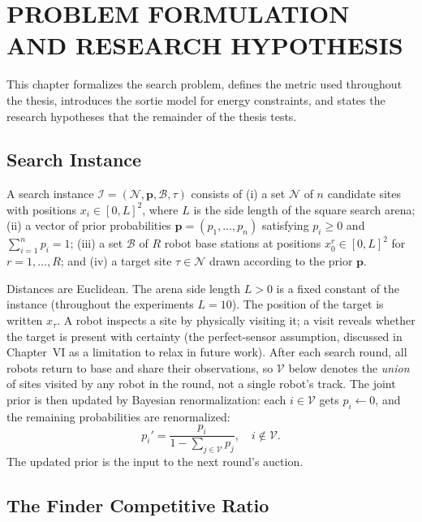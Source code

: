 \chapter{PROBLEM FORMULATION AND RESEARCH HYPOTHESIS}\label{ch:problem}

\begin{doublespacing}

This chapter formalizes the search problem, defines the metric used
throughout the thesis, introduces the sortie model for energy
constraints, and states the research hypotheses that the remainder of
the thesis tests.

\section{Search Instance}

\begin{definition}
A search instance $\mathcal{I} = (\mathcal{N}, \mathbf{p}, \mathcal{B}, \tau)$
consists of (i) a set $\mathcal{N}$ of $n$ candidate sites with positions
$x_i \in [0, L]^2$, where $L$ is the side length of the square search
arena; (ii) a vector of prior probabilities
$\mathbf{p} = (p_1, \ldots, p_n)$ satisfying $p_i \geq 0$ and
$\sum_{i=1}^n p_i = 1$; (iii) a set $\mathcal{B}$ of $R$ robot base
stations at positions $x_0^r \in [0, L]^2$ for $r = 1, \ldots, R$; and
(iv) a target site $\tau \in \mathcal{N}$ drawn according to the prior
$\mathbf{p}$.
\end{definition}

Distances are Euclidean. The arena side length $L > 0$ is a fixed
constant of the instance (throughout the experiments $L = 10$). The
position of the target is written $x_\tau$. A robot inspects a site
by physically visiting it; a visit reveals whether the target is
present with certainty (the perfect-sensor assumption, discussed in
Chapter~VI as a limitation to relax in future work). After each
search round, all robots return to base and share their observations,
so $\mathcal{V}$ below denotes the \emph{union} of sites visited by
any robot in the round, not a single robot's track. The joint prior
is then updated by Bayesian renormalization: each $i \in \mathcal{V}$
gets $p_i \leftarrow 0$, and the remaining probabilities are
renormalized:
\[
  p_i' = \frac{p_i}{1 - \sum_{j \in \mathcal{V}} p_j}, \quad i \notin \mathcal{V}.
\]
The updated prior is the input to the next round's auction.

\section{The Finder Competitive Ratio}


\end{doublespacing}
